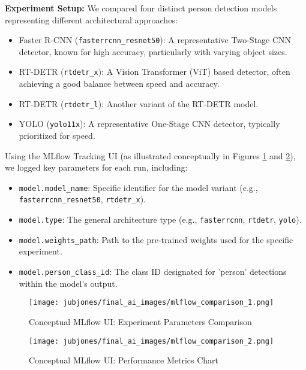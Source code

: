 \textbf{Experiment Setup:}
We compared four distinct person detection models representing different architectural approaches:
\begin{itemize}
    \item Faster R-CNN (\texttt{fasterrcnn\_resnet50}): A representative Two-Stage CNN detector, known for high accuracy, particularly with varying object sizes.
    \item RT-DETR (\texttt{rtdetr\_x}): A Vision Transformer (ViT) based detector, often achieving a good balance between speed and accuracy.
    \item RT-DETR (\texttt{rtdetr\_l}): Another variant of the RT-DETR model.
    \item YOLO (\texttt{yolo11x}): A representative One-Stage CNN detector, typically prioritized for speed.
\end{itemize}
Using the MLflow Tracking UI (as illustrated conceptually in Figures \ref{fig:mlflow_comparison_1} and \ref{fig:mlflow_comparison_2}), we logged key parameters for each run, including:
\begin{itemize}
    \item \texttt{model.model\_name}: Specific identifier for the model variant (e.g., \texttt{fasterrcnn\_resnet50}, \texttt{rtdetr\_x}).
    \item \texttt{model.type}: The general architecture type (e.g., \texttt{fasterrcnn}, \texttt{rtdetr}, \texttt{yolo}).
    \item \texttt{model.weights\_path}: Path to the pre-trained weights used for the specific experiment.
    \item \texttt{model.person\_class\_id}: The class ID designated for 'person' detections within the model's output.
\end{itemize}

\begin{figure}[!htb]
    \centering
    \texttt{[image: jubjones/final\_ai\_images/mlflow\_comparison\_1.png]} %
    \caption{Conceptual MLflow UI: Experiment Parameters Comparison}
    \label{fig:mlflow_comparison_1}
\end{figure}

\begin{figure}[!htb]
    \centering
    \texttt{[image: jubjones/final\_ai\_images/mlflow\_comparison\_2.png]} %
    \caption{Conceptual MLflow UI: Performance Metrics Chart}
    \label{fig:mlflow_comparison_2}
\end{figure}
\clearpage


